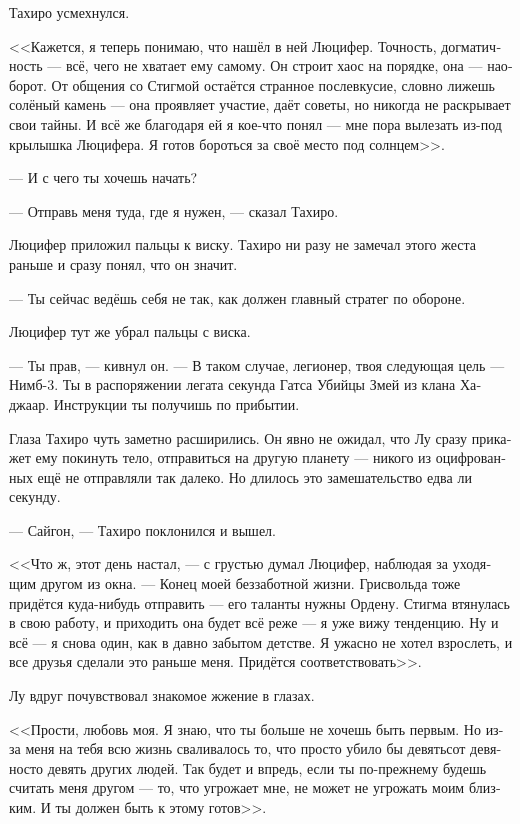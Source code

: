\documentclass[a4paper,12pt,fleqn]{book}\usepackage{cooltooltips}\usepackage{polyglossia}\setdefaultlanguage[babelshorthands=true]{russian}\setotherlanguage{english}\defaultfontfeatures{Ligatures=TeX,Mapping=tex-text} \usepackage{xcolor}\definecolor{lightgray}{HTML}{bbbbbb}\color{lightgray}\newcommand{\ml}[3]{\textenglish{\textcolor{black}{#3}}}
\newcommand{\asterism}{\vspace{1em}{\centering\Large\bfseries$\ast~\ast~\ast$\par}\vspace{1em}}
\begin{document}
{Тахиро усмехнулся.

<<Кажется, я теперь понимаю, что нашёл в ней Люцифер.
Точность, догматичность --- всё, чего не хватает ему самому.
Он строит хаос на порядке, она --- наоборот.
От общения со Стигмой остаётся странное послевкусие, словно лижешь солёный камень --- она проявляет участие, даёт советы, но никогда не раскрывает свои тайны.
И всё же благодаря ей я кое-что понял --- мне пора вылезать из-под крылышка Люцифера.
Я готов бороться за своё место под солнцем>>.

\asterism

--- И с чего ты хочешь начать?

--- Отправь меня туда, где я нужен, --- сказал Тахиро.

Люцифер приложил пальцы к виску.
Тахиро ни разу не замечал этого жеста раньше и сразу понял, что он значит.

--- Ты сейчас ведёшь себя не так, как должен главный стратег по обороне.

Люцифер тут же убрал пальцы с виска.

--- Ты прав, --- кивнул он.
--- В таком случае, легионер, твоя следующая цель --- Нимб-3.
Ты в распоряжении легата секунда Гатса Убийцы Змей из клана Хаджаар.
Инструкции ты получишь по прибытии.

Глаза Тахиро чуть заметно расширились.
Он явно не ожидал, что Лу сразу прикажет ему покинуть тело, отправиться на другую планету --- никого из оцифрованных ещё не отправляли так далеко.
Но длилось это замешательство едва ли секунду.

--- Сайгон, --- Тахиро поклонился и вышел.

<<Что ж, этот день настал, --- с грустью думал Люцифер, наблюдая за уходящим другом из окна.
--- Конец моей беззаботной жизни.
Грисвольда тоже придётся куда-нибудь отправить --- его таланты нужны Ордену.
Стигма втянулась в свою работу, и приходить она будет всё реже --- я уже вижу тенденцию.
Ну и всё --- я снова один, как в давно забытом детстве.
Я ужасно не хотел взрослеть, и все друзья сделали это раньше меня.
Придётся соответствовать>>.

Лу вдруг почувствовал знакомое жжение в глазах.

<<Прости, любовь моя.
Я знаю, что ты больше не хочешь быть первым.
Но из-за меня на тебя всю жизнь сваливалось то, что просто убило бы девятьсот девяносто девять других людей.
Так будет и впредь, если ты по-прежнему будешь считать меня другом --- то, что угрожает мне, не может не угрожать моим близким.
И ты должен быть к этому готов>>.

}
\end{document}
